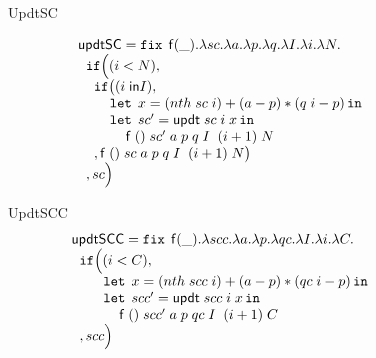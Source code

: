\documentclass[a4paper,11pt]{article}
\theoremstyle{definition}
\begin{document}
\begin{figure}
UpdtSC

\[
\begin{array}{l}
 \mathsf{updtSC} = \mathop{\mathtt{fix}} \;  \mathsf{f}(\_). \lambda sc. \lambda a. \lambda
  p. \lambda q.  \lambda I. \lambda i. \lambda N. \\
 \hspace{.2cm} \mathtt{if}   \Big (   (i < N)  ,  \\
 \hspace{0.4cm}  \mathtt{if} \big( ( i \; \mathsf{in} I  ) ,       \\
 \hspace{0.8cm} \mathop{\mathtt{let}} \; x =( nth \; sc \; i) + (a-p)*(q
  \; i - p)  \mathop{ \mathtt{in}} \\
 \hspace{0.8cm} \mathop{\mathtt{let}} \; sc' =  \mathsf{updt} \; sc \; i
  \; x \mathop{ \mathtt{in}} \\
  \hspace{1.2cm} \mathsf{f}  \; () \; sc' \; a \; p
 \; q \; I \;  \; (i+1) \;  N  \\ 
\hspace{0.4cm}  ,  \mathsf{f}  \; () \; sc \; a \; p
 \; q \; I \;  \; (i+1) \;  N \big )  \\ 
\hspace{0.2cm}   ,  sc  \Big ) \\
 
\end{array}
\]

UpdtSCC
\[
\begin{array}{l}
 \mathsf{updtSCC} = \mathop{\mathtt{fix}} \;  \mathsf{f}(\_). \lambda scc. \lambda a. \lambda
  p. \lambda qc.  \lambda I. \lambda i. \lambda C. \\
 \hspace{.2cm} \mathtt{if}   \Big (   (i < C)  ,  \\
 \hspace{0.8cm} \mathop{\mathtt{let}} \; x =( nth \; scc \; i) + (a-p)*(qc
  \; i - p)  \mathop{ \mathtt{in}} \\
 \hspace{0.8cm} \mathop{\mathtt{let}} \; scc' =  \mathsf{updt} \; scc \; i
  \; x \mathop{ \mathtt{in}} \\
  \hspace{1.2cm} \mathsf{f}  \; () \; scc' \; a \; p
 \; qc \; I \;  \; (i+1) \;  C  \\ 
\hspace{0.2cm}   ,  scc  \Big ) \\
 
\end{array}
\]



\end{figure}
\end{document}
